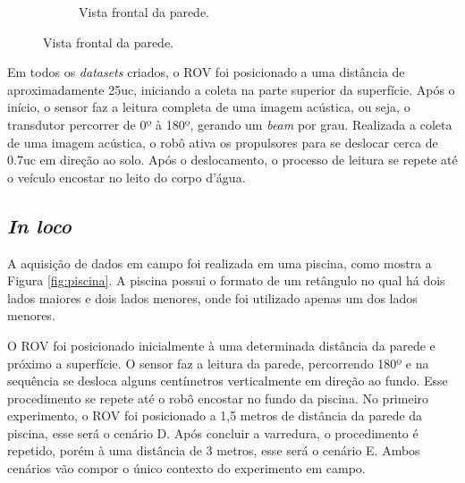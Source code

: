 \begin{figure}[H]
\begin{subfigure}[t]{0.328\textwidth}
        \caption{Vista frontal da parede.}
        \label{fig:dim_frontal}
    \end{subfigure}
\end{figure}

Em todos os \textit{datasets} criados, o ROV foi posicionado a uma distância de aproximadamente 25uc, iniciando a coleta na parte superior da superfície. 
Após o início, o sensor faz a leitura completa de uma imagem acústica, ou seja, o transdutor percorrer de 0º à  180º, gerando um \textit{beam} por grau.
Realizada a coleta de uma imagem acústica, o robô ativa os propulsores para se deslocar cerca de 0.7uc em direção ao solo. 
Após o deslocamento, o processo de leitura se repete até o veículo encostar no leito do corpo d'água.


\subsection{\textit{In loco}}
\label{sec:in_loco}

A aquisição de dados em campo foi realizada em uma piscina, como mostra a Figura \ref{fig:piscina}.
A piscina possui o formato de um retângulo no qual há dois lados maiores e dois lados menores, onde foi utilizado apenas um dos lados menores.

O ROV foi posicionado inicialmente à uma determinada distância da parede e próximo a superfície.
O sensor faz a leitura da parede, percorrendo 180º e na sequência se desloca alguns centímetros verticalmente em direção ao fundo.
Esse procedimento se repete até o robô encostar no fundo da piscina.
No primeiro experimento, o ROV foi posicionado a 1,5 metros de distância da parede da piscina, esse será o cenário D.
Após concluir a varredura, o procedimento é repetido, porém à uma distância de 3 metros, esse será o cenário E.
Ambos cenários vão compor o único contexto do experimento em campo.


